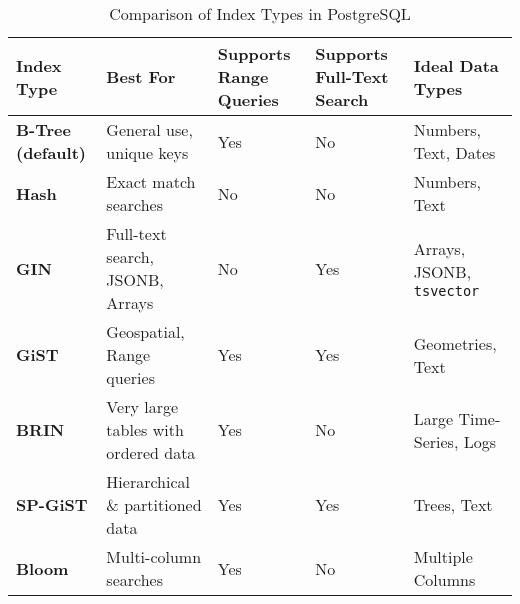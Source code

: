 \documentclass{article}
\begin{document}
\begin{table}
    \centering
    \renewcommand{\arraystretch}{1.3}
    \begin{tabular}{l p{2.5cm} p{2.5cm} p{2.5cm} p{2.5cm}}
		\toprule
        \textbf{Index Type} & \textbf{Best For} & \textbf{Supports Range Queries} & \textbf{Supports Full-Text Search} & \textbf{Ideal Data Types} \\
        \midrule
        \textbf{B-Tree (default)} & General use, unique keys & Yes & No & Numbers, Text, Dates \\
        \textbf{Hash} & Exact match searches & No & No & Numbers, Text \\
        \textbf{GIN} & Full-text search, JSONB, Arrays & No & Yes & Arrays, JSONB, \texttt{tsvector} \\
        \textbf{GiST} & Geospatial, Range queries & Yes & Yes & Geometries, Text \\
        \textbf{BRIN} & Very large tables with ordered data & Yes & No & Large Time-Series, Logs \\
        \textbf{SP-GiST} & Hierarchical \& partitioned data & Yes & Yes & Trees, Text \\
        \textbf{Bloom} & Multi-column searches & Yes & No & Multiple Columns \\
        \bottomrule
    \end{tabular}
    \caption{Comparison of Index Types in PostgreSQL}
    \label{tab:postgresql_indexes}
\end{table}
\end{document}
